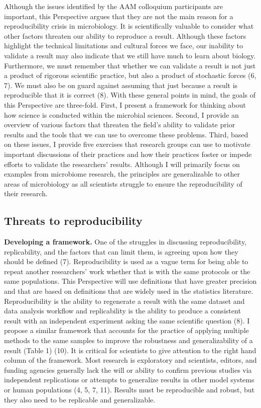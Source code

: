 \documentclass[]{article}
\begin{document}
Although the issues identified by the AAM colloquium participants are
important, this Perspective argues that they are not the main reason for
a reproducibility crisis in microbiology. It is scientifically valuable
to consider what other factors threaten our ability to reproduce a
result. Although these factors highlight the technical limitations and
cultural forces we face, our inability to validate a result may also
indicate that we still have much to learn about biology. Furthermore, we
must remember that whether we can validate a result is not just a
product of rigorous scientific practice, but also a product of
stochastic forces (6, 7). We must also be on guard against assuming that
just because a result is reproducible that it is correct (8). With these
general points in mind, the goals of this Perspective are three-fold.
First, I present a framework for thinking about how science is conducted
within the microbial sciences. Second, I provide an overview of various
factors that threaten the field's ability to validate prior results and
the tools that we can use to overcome these problems. Third, based on
these issues, I provide five exercises that research groups can use to
motivate important discussions of their practices and how their
practices foster or impede efforts to validate the researchers' results.
Although I will primarily focus on examples from microbiome research,
the principles are generalizable to other areas of microbiology as all
scientists struggle to ensure the reproducibility of their research.

\subsection{Threats to
reproducibility}\label{threats-to-reproducibility}

\textbf{Developing a framework.} One of the struggles in discussing
reproducibility, replicability, and the factors that can limit them, is
agreeing upon how they should be defined (7). Reproducibility is used as
a vague term for being able to repeat another researchers' work whether
that is with the same protocols or the same populations. This
Perspective will use definitions that have greater precision and that
are based on definitions that are widely used in the statistics
literature. Reproducibility is the ability to regenerate a result with
the same dataset and data analysis workflow and replicability is the
ability to produce a consistent result with an independent experiment
asking the same scientific question (8). I propose a similar framework
that accounts for the practice of applying multiple methods to the same
samples to improve the robustness and generalizability of a result
(Table 1) (10). It is critical for scientists to give attention to the
right hand column of the framework. Most research is exploratory and
scientists, editors, and funding agencies generally lack the will or
ability to confirm previous studies via independent replications or
attempts to generalize results in other model systems or human
populations (4, 5, 7, 11). Results must be reproducible and robust, but
they also need to be replicable and generalizable.
\end{document}
